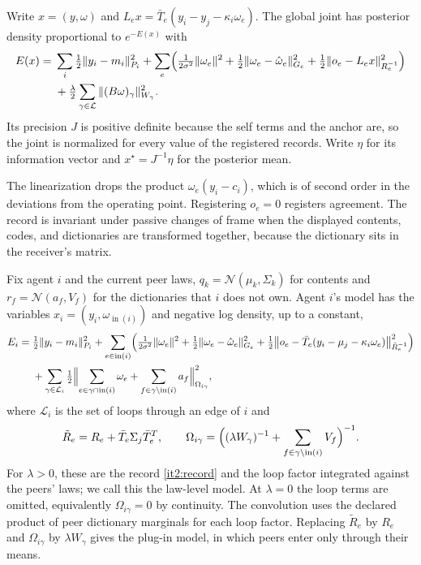 \documentclass[11pt,letterpaper]{report}
\newcommand{\inn}{\operatorname{in}}
\begin{document}
Write $x=(y,\omega)$ and $L_ex=\bar T_e(y_i-y_j-\kappa_i\omega_e)$. The global joint has posterior density proportional to $e^{-E(x)}$ with
\begin{equation}
\begin{aligned}
E(x)={}&\sum_i\tfrac12\Vert y_i-m_i\Vert_{P_i}^2+\sum_e\Bigl(\tfrac1{2\sigma^2}\Vert\omega_e\Vert^2+\tfrac12\Vert\omega_e-\hat\omega_e\Vert_{G_e}^2+\tfrac12\Vert o_e-L_ex\Vert_{R_e^{-1}}^2\Bigr)\\
&+\tfrac\lambda2\sum_{\gamma\in\mathcal L}\Vert(B\omega)_\gamma\Vert_{W_\gamma}^2.
\end{aligned}
\label{it2:global-energy}
\end{equation}
Its precision $J$ is positive definite because the self terms and the anchor are, so the joint is normalized for every value of the registered records. Write $\eta$ for its information vector and $x^\star=J^{-1}\eta$ for the posterior mean.

The linearization drops the product $\omega_e(y_i-c_i)$, which is of second order in the deviations from the operating point. Registering $o_e=0$ registers agreement. The record is invariant under passive changes of frame when the displayed contents, codes, and dictionaries are transformed together, because the dictionary sits in the receiver's matrix.

Fix agent $i$ and the current peer laws, $q_k=\mathcal N(\mu_k,\Sigma_k)$ for contents and $r_f=\mathcal N(a_f,V_f)$ for the dictionaries that $i$ does not own. Agent $i$'s model has the variables $x_i=(y_i,\omega_{\inn(i)})$ and negative log density, up to a constant,
\begin{equation}
\begin{aligned}
E_i={}&\tfrac12\Vert y_i-m_i\Vert_{P_i}^2+\sum_{e\in\inn(i)}\Bigl(\tfrac1{2\sigma^2}\Vert\omega_e\Vert^2+\tfrac12\Vert\omega_e-\hat\omega_e\Vert_{G_e}^2+\tfrac12\bigl\Vert o_e-\bar T_e(y_i-\mu_j-\kappa_i\omega_e)\bigr\Vert_{\tilde R_e^{-1}}^2\Bigr)\\
&+\sum_{\gamma\in\mathcal L_i}\tfrac12\Bigl\Vert\sum_{e\in\gamma\cap\inn(i)}\omega_e+\sum_{f\in\gamma\setminus\inn(i)}a_f\Bigr\Vert_{\Omega_{i\gamma}}^2,
\end{aligned}
\label{it2:agent-energy}
\end{equation}
where $\mathcal L_i$ is the set of loops through an edge of $i$ and
\begin{equation}
\tilde R_e=R_e+\bar T_e\Sigma_j\bar T_e^T,\qquad
\Omega_{i\gamma}=\Bigl((\lambda W_\gamma)^{-1}+\sum_{f\in\gamma\setminus\inn(i)}V_f\Bigr)^{-1}.
\label{it2:widening}
\end{equation}
For $\lambda>0$, these are the record \cref{it2:record} and the loop factor integrated against the peers' laws; we call this the law-level model. At $\lambda=0$ the loop terms are omitted, equivalently $\Omega_{i\gamma}=0$ by continuity. The convolution uses the declared product of peer dictionary marginals for each loop factor. Replacing $\tilde R_e$ by $R_e$ and $\Omega_{i\gamma}$ by $\lambda W_\gamma$ gives the plug-in model, in which peers enter only through their means.
\end{document}
